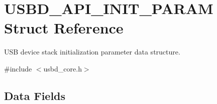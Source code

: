 \hypertarget{structUSBD__API__INIT__PARAM}{\section{U\-S\-B\-D\-\_\-\-A\-P\-I\-\_\-\-I\-N\-I\-T\-\_\-\-P\-A\-R\-A\-M Struct Reference}
\label{structUSBD__API__INIT__PARAM}
}


U\-S\-B device stack initialization parameter data structure.  




{\ttfamily \#include $<$usbd\-\_\-core.\-h$>$}

\subsection*{Data Fields}

